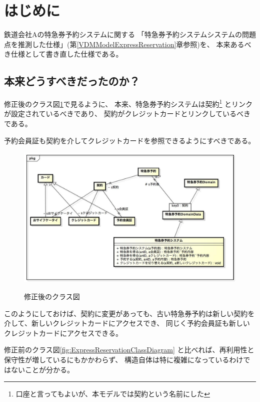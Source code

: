 \section {はじめに}
鉄道会社Aの特急券予約システムに関する
「特急券予約システムシステムの問題点を推測した仕様」(第\ref{VDMModelExpressReservation}章参照)を、
本来あるべき仕様として書き直した仕様である。

\subsection{本来どうすべきだったのか？}
修正後のクラス図\ref{fig:EvolvedExpressReservationModifiedClassDiagram}で見るように、
本来、特急券予約システムは契約\footnote{口座と言ってもよいが、本モデルでは契約という名前にした}
とリンクが設定されているべきであり、
契約がクレジットカードとリンクしているべきである。

予約会員証も契約を介してクレジットカードを参照できるようにすべきである。

\begin{figure}[h]
	\centering
	{\includegraphics[width=55zw, keepaspectratio]{./EvolvedExpressReservation/image/ModifiedClassDiagram.jpg}}
	\caption{修正後のクラス図}
	\label{fig:EvolvedExpressReservationModifiedClassDiagram}
\end{figure}

このようにしておけば、契約に変更があっても、古い特急券予約は新しい契約を介して、新しいクレジットカードにアクセスでき、
同じく予約会員証も新しいクレジットカードにアクセスできる。

修正前のクラス図\ref{fig:ExpressReservationClassDiagram}
と比べれば、再利用性と保守性が増しているにもかかわらず、
構造自体は特に複雑になっているわけではないことが分かる。
